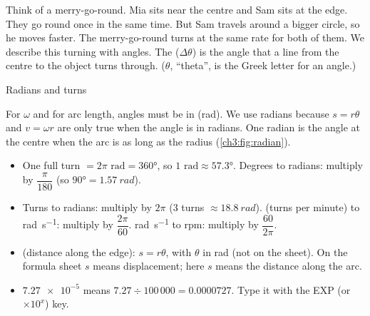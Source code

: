 \begin{keywords}
\end{keywords}

Think of a merry-go-round. Mia sits near the centre and Sam sits at the edge. They go round
once in the same time. But Sam travels around a bigger circle, so he moves faster. The
merry-go-round turns at the same rate for both of them. We describe this turning with
angles. The  ($\Delta\theta$) is the angle that a line from the
centre to the object turns through. ($\theta$, ``theta'', is the Greek letter for an angle.)

\begin{toolkit}{Radians and turns}
\begin{sidebyside}[0.68]
For $\omega$ and for arc length, angles must be in  (rad). We use radians
because $s = r\theta$ and $v = \omega r$ are only true when the angle is in radians. One
radian is the angle at the centre when the arc is as long as the radius (\cref{ch3:fig:radian}).
\begin{itemize}
  \item One full turn $= 2\pi \text{ rad} = \ang{360}$, so $1 \text{ rad} \approx \ang{57.3}$.
        Degrees to radians: multiply by $\dfrac{\pi}{180}$ (so $\ang{90} = \qty{1.57}{rad}$).
  \item Turns to radians: multiply by $2\pi$ (3 turns $\approx \qty{18.8}{rad}$).
         (turns per minute) to \si{rad.s^{-1}}: multiply by $\dfrac{2\pi}{60}$.
        \si{rad.s^{-1}} to rpm: multiply by $\dfrac{60}{2\pi}$.
  \item {} (distance along the edge): $s = r\theta$, with $\theta$ in rad (not on
        the sheet). On the formula sheet $s$ means displacement; here $s$ means the distance
        along the arc.
  \item $\num{7.27e-5}$ means $7.27 \div 100\,000 = 0.0000727$. Type it with the EXP
        (or $\times10^x$) key.
\end{itemize}
\nextside
  \centering
  \label{ch3:fig:radian}
\end{sidebyside}
\end{toolkit}

